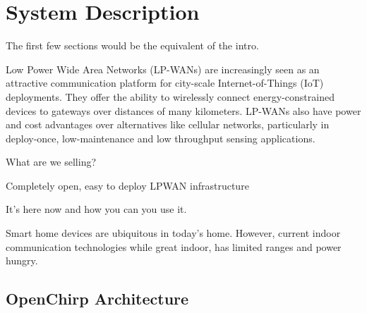 \documentclass[conference]{IEEEtran}
\begin{document}
\IEEEpeerreviewmaketitle







\section{System Description}
\label{sec:system}

{\color{red} The first few sections would be the equivalent of the intro.}

Low Power Wide Area Networks (LP-WANs) are increasingly seen as an attractive
communication platform for city-scale Internet-of-Things (IoT) deployments.
They offer the ability to wirelessly connect energy-constrained devices to
gateways over distances of many kilometers. LP-WANs also have power and cost
advantages over alternatives like cellular networks, particularly in
deploy-once, low-maintenance and low throughput sensing applications.

What are we selling?


Completely open, easy to deploy LPWAN infrastructure

It's here now and how you can you use it.


Smart home devices are ubiquitous in today's home. However, current indoor
communication technologies while great indoor, has limited ranges and power
hungry.

\subsection{OpenChirp Architecture}
\label{sec:oc-arch}
\end{document}
